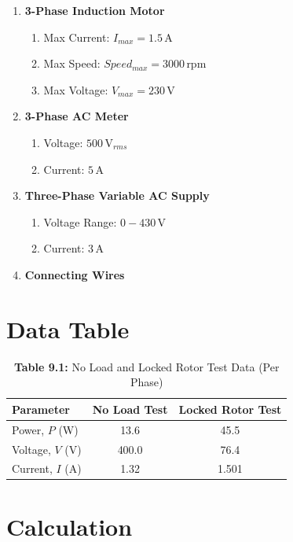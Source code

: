 \documentclass[a4paper,12pt]{article}
\begin{document}
\begin{enumerate}
	\item \textbf{3-Phase Induction Motor}
	\begin{enumerate}
		\item Max Current: $I_{max} = 1.5\, \text{A}$
		\item Max Speed: $Speed_{max} = 3000\, \text{rpm}$
		\item Max Voltage: $V_{max} = 230\, \text{V}$
	\end{enumerate}
	
	\item \textbf{3-Phase AC Meter}
	\begin{enumerate}
		\item Voltage: $500\, \text{V}_{rms}$
		\item Current: $5\, \text{A}$
	\end{enumerate}
	
	\item \textbf{Three-Phase Variable AC Supply}
	\begin{enumerate}
		\item Voltage Range: $0 - 430\, \text{V}$
		\item Current: $3\, \text{A}$
	\end{enumerate}
	
	\item \textbf{Connecting Wires}
\end{enumerate}





\section{Data Table}

\begin{table}[H]
	\centering
	\begin{tabular}{|l|c|c|}
		\hline
		\textbf{Parameter} & \textbf{No Load Test} & \textbf{Locked Rotor Test} \\
		\hline
		Power, $P$ (W) & 13.6 & 45.5 \\
		\hline
		Voltage, $V$ (V) & 400.0 & 76.4  \\
		\hline
		Current, $I$ (A) & 1.32 & 1.501 \\
		\hline
	\end{tabular}
	\caption*{\textbf{Table 9.1:} No Load and Locked Rotor Test Data (Per Phase)}
\end{table}


\section{Calculation}
\end{document}
